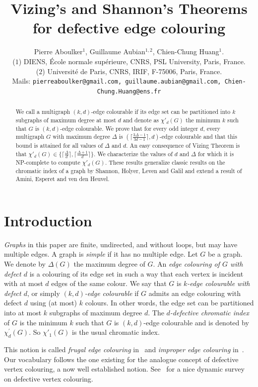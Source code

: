 \documentclass[11pt]{article}
\title{Vizing's and Shannon's Theorems for defective edge colouring}
\author{Pierre Aboulker$^1$, Guillaume Aubian$^{1,2}$, Chien-Chung Huang$^{1}$. \\
\small ($1$) DIENS, \'Ecole normale sup\'erieure, CNRS, PSL University, Paris, France.  \\
\small ($2$) Université de Paris, CNRS, IRIF, F-75006, Paris, France.\\
 \small{Mails: \tt pierreaboulker@gmail.com, guillaume.aubian@gmail.com,  Chien-Chung.Huang@ens.fr}}
\begin{document}
\maketitle
\begin{abstract}
We call a multigraph $(k,d)$-edge colourable if its edge set can be partitioned into  $k$ subgraphs of maximum degree at most $d$ and denote as $\chi'_{d}(G)$ the minimum $k$ such that $G$ is $(k,d)$-edge colourable.  
We prove that for every odd integer $d$, every multigraph $G$ with maximum degree $\Delta$ is  $(\lceil \frac{3\Delta - 1}{3d - 1} \rceil, d)$-edge colourable and that this bound is attained for all values of $\Delta$ and $d$. 
An easy consequence of Vizing Theorem is that $\chi'_{d}(G) \in \{ \lceil \frac{\Delta}{d} \rceil, \lceil \frac{\Delta+1}{d} \rceil \}$. We characterize the values of $d$ and $\Delta$ for which it is NP-complete to compute $\chi'_d(G)$. These results generalize  classic results on the chromatic index of a graph by Shannon, Holyer, Leven and Galil and extend a result of Amini, Esperet and ven den Heuvel.
\end{abstract}

\section{Introduction}
\emph{Graphs} in this paper are finite, undirected, and without loops, but may have multiple edges.  A graph is \textit{simple} if it has no multiple edge.
Let $G$ be a graph. 
We denote by $\Delta(G)$ the maximum degree of $G$. 
An \emph{edge colouring of $G$ with defect $d$} is a colouring of its edge set in such a way that each vertex is incident with at most $d$ edges of the same colour. We say that $G$ is \emph{$k$-edge colourable with defect $d$}, or simply \emph{$(k,d)$-edge colourable} if $G$ admits an edge colouring with defect $d$ using (at most) $k$ colours. In other words, the edge set can be partitioned into at most $k$ subgraphs of maximum degree $d$. 
 The \emph{$d$-defective chromatic index} of $G$ is the minimum $k$ such that $G$ is $(k,d)$-edge colourable and is denoted by $\chi^{'}_{d}(G)$. 
So $\chi'_1(G)$ is the usual chromatic index. 

This notion is called \textit{frugal edge colouring} in~\cite{amini:inria-00144318} and \textit{improper edge colouring} in~\cite{HILTON2001253}. Our vocabulary follows the one existing for the  analogue concept of defective vertex colouring, a now well established notion. See~\cite{W18} for a nice dynamic survey on defective vertex colouring. 
\end{document}
